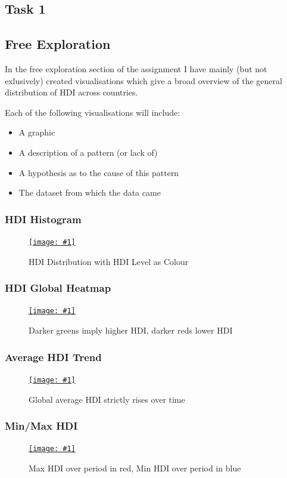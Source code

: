 \documentclass[11pt,a4paper,final]{article}
\newcommand\onlinefig[3]{
\begin{figure}[H]
  \centering
  \href{#3}{\texttt{[image: \#1]}}
  \caption{#2} 
  \label{fig:#1}
\end{figure}
}
\begin{document}
\pagebreak
\begin{multicols}{2}
\section{Task 1}
\subsection{Free Exploration}
In the free exploration section of the assignment I have mainly (but not exlusively) created visualisations which give a broad overview of the general distribution of HDI across countries.

Each of the following visualisations will include:
\begin{itemize}
	\item A graphic
	\item A description of a pattern (or lack of)
	\item A hypothesis as to the cause of this pattern
	\item The dataset from which the data came
\end{itemize}

\subsubsection{HDI Histogram}
\onlinefig{hdi_histogram}{HDI Distribution with HDI Level as Colour}{https://public.tableau.com/views/CS3205-HDI/Sheet6?:language=en-GB&:display_count=n&:origin=viz_share_link}

\subsubsection{HDI Global Heatmap}
\onlinefig{hdi_global_heatmap}{Darker greens imply higher HDI, darker reds lower HDI}{https://public.tableau.com/views/CS3205-HDI/Sheet3?:language=en-GB&:display_count=n&:origin=viz_share_link}

\subsubsection{Average HDI Trend}
\onlinefig{global_average_hdi_areachart}{Global average HDI strictly rises over time}{https://public.tableau.com/views/CS3205_hdi_csv/Sheet2?:language=en-GB&:display_count=n&:origin=viz_share_link}

\subsubsection{Min/Max HDI}
\onlinefig{min_vs_max_hdi_radialplot}{Max HDI over period in red, Min HDI over period in blue}{https://user-images.githubusercontent.com/56483187/155840052-f17e03e9-c48b-4dfd-8096-2bd5f066dd91.png}


\end{multicols}
\end{document}
